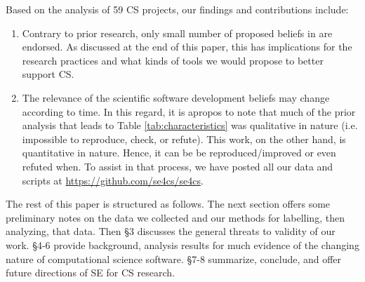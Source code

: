 \documentclass[sigconf,review,anonymous]{acmart}
\newcommand{\be}{\begin{enumerate}}
\newcommand{\ee}{\end{enumerate}}
\begin{document}
Based on the analysis of 59 CS projects, our findings and contributions include: 
\be
\item Contrary to prior research, only small number of proposed beliefs in \cite{johan18_secs} are endorsed. As discussed at the end of this paper, this has implications for the research practices and what kinds of tools we would propose to better support CS. 
\item The relevance of the scientific software development beliefs may change according to time.
In this regard, it is apropos to note that
  much of the prior analysis that leads to Table \ref{tab:characteristics} was qualitative in nature (i.e. impossible to reproduce, check, or refute). This work, on the other hand, is quantitative in nature. Hence, it can be be reproduced/improved or even refuted when.  To assist in that process,  we have posted all our data and scripts at
\url{https://github.com/se4cs/se4cs}. 
\ee
The rest of this paper is structured as follows.
The next section offers some preliminary notes on the data
we collected and our methods for labelling, then analyzing,
that data. Then \S3 discusses the general threats to validity of our work. \S4-6 provide background, analysis results for much evidence
of the changing nature of computational science software. \S7-8 summarize, conclude, and offer future directions of SE for CS research. 






 






\end{document}
